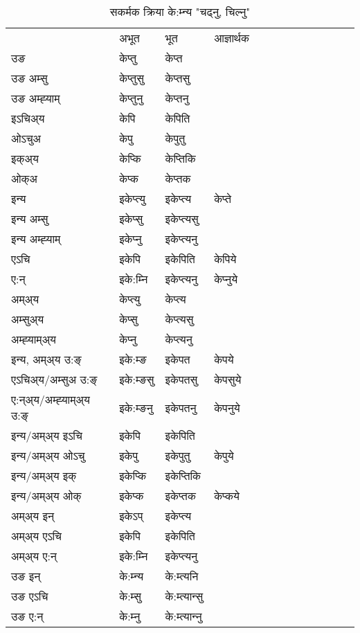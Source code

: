 \begin{table}[H]
\centering
\caption{\label{ept.vt} सकर्मक क्रिया  के:म्‍न्य  "चढ्नु, चिल्नु"  }
\begin{tabular}{l|l|l|l|l|l|l|l|l|l|l|l|l}  \toprule
&अभूत & भूत & आज्ञार्थक \\ 
उङ &केप्‍तु &केप्‍त \\ 
उङ अम्सु&केप्‍तुसु &केप्‍तसु \\ 
उङ अम्ह्‍याम्&केप्‍तुनु &केप्‍तनु \\ 
इऽचिअ्य &केपि &केपिति   \\ 
ओऽचुअ        &केपु &केपुतु   \\ 
इक्अ्य&केप्कि &केप्‍तिकि   \\ 
ओक्अ &केप्क &केप्‍तक   \\ 
इन्य & इकेप्‍त्यु  & इकेप्‍त्य &केप्‍ते  \\ 
इन्य अम्सु& इकेप्सु  & इकेप्‍त्यसु   \\ 
इन्य अम्ह्‍याम्& इकेप्‍नु  & इकेप्‍त्यनु   \\ 
एऽचि & इकेपि & इकेपिति &केपिये    \\ 
ए:न् & इके:म्‍नि  & इकेप्‍त्यनु &केप्‍नुये  \\ 
अम्अ्य & केप्‍त्यु  & केप्‍त्य  \\ 
अम्सुअ्य & केप्सु & केप्‍त्यसु  \\ 
अम्ह्‍याम्अ्य & केप्‍नु  & केप्‍त्यनु \\ 
\midrule
इन्य, अम्अ्य उ:ङ्‌ &इके:म्ङ &इकेपत &केपये \\ 
एऽचिअ्य/अम्सुअ उ:ङ्‌ &इके:म्ङसु &इकेपतसु &केपसुये \\ 
ए:न्अ्य/अम्ह्‍याम्अ्य उ:ङ्‌ &इके:म्ङनु &इकेपतनु &केपनुये \\ 
इन्य/अम्अ्य इऽचि &इकेपि &इकेपिति    \\ 
इन्य/अम्अ्य ओऽचु &इकेपु &इकेपुतु  &केपुये  \\ 
इन्य/अम्अ्य इक् &इकेप्कि &इकेप्‍तिकि   \\ 
इन्य/अम्अ्य ओक् &इकेप्क &इकेप्‍तक  &केप्कये  \\ 
अम्अ्य इन् & इकेऽप् & इकेप्‍त्य   \\ 
अम्अ्य एऽचि & इकेपि & इकेपिति    \\ 
अम्अ्य ए:न् & इके:म्‍नि  & इकेप्‍त्यनु  \\ 
\midrule
उङ इन् & के:म्‍न्य  & के:म्त्यनि  \\ 
उङ एऽचि & के:म्सु  & के:म्त्यान्सु   \\ 
उङ ए:न्& के:म्‍नु  & के:म्त्यान्‍नु   \\ 
\bottomrule
\end{tabular}
\end{table}


